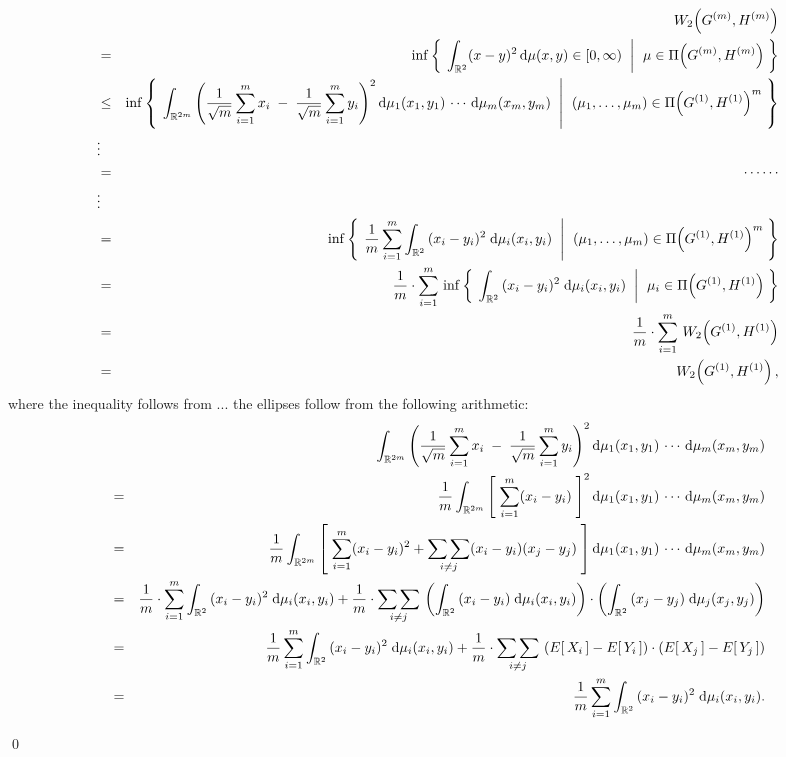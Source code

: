\proof
\begin{eqnarray*}
&&
	W_{2}\!\left(G^{(m)},H^{(m)}\right)
\\
& = &
	\inf\left\{\; \left. \int_{\mathbb{R}^{2}}(x - y)^{2}\,\textnormal{d}\mu(x,y) \in [0,\infty) \;\;\right\vert\;\, \mu \in \Pi\!\left(G^{(m)},H^{(m)}\right) \;\right\}
\\
&\leq&
	\inf\left\{\; \left.
	\int_{\mathbb{R}^{2m}}\left(\dfrac{1}{\sqrt{m}}\sum_{i=1}^{m}x_{i} \;-\; \dfrac{1}{\sqrt{m}}\sum_{i=1}^{m}y_{i}\right)^{2}
	\textnormal{d}\mu_{1}(x_{1},y_{1})\,\cdots\,\textnormal{d}\mu_{m}(x_{m},y_{m})
	\;\;\right\vert\;\,
	(\mu_{1},\ldots,\mu_{m}) \in \Pi\!\left(G^{(1)},H^{(1)}\right)^{m}
	\;\right\}
\\
&\vdots&
\\
&=& \cdots\cdots
\\
&\vdots&
\\
&=&
	\inf\left\{\; \left.
	\dfrac{1}{m}\sum_{i=1}^{m}\int_{\mathbb{R}^{2}}\,(x_{i}-y_{i})^{2}\;\textnormal{d}\mu_{i}(x_{i},y_{i})	
	\;\;\right\vert\;\,
	(\mu_{1},\ldots,\mu_{m}) \in \Pi\!\left(G^{(1)},H^{(1)}\right)^{m}
	\;\right\}
\\
&=&
	\dfrac{1}{m}\cdot\sum_{i=1}^{m}\,
	\inf\left\{\; \left.
	\int_{\mathbb{R}^{2}}\,(x_{i}-y_{i})^{2}\;\textnormal{d}\mu_{i}(x_{i},y_{i})	
	\;\;\right\vert\;\,
	\mu_{i} \in \Pi\!\left(G^{(1)},H^{(1)}\right)
	\;\right\}
\\
&=&
	\dfrac{1}{m}\cdot\sum_{i=1}^{m} \, W_{2}\!\left(G^{(1)},H^{(1)}\right)
\\
&=&
	W_{2}\!\left(G^{(1)},H^{(1)}\right),
\end{eqnarray*}
where the inequality follows from ...
the ellipses follow from the following arithmetic:
\begin{eqnarray*}
&&
	\int_{\mathbb{R}^{2m}}\left(\dfrac{1}{\sqrt{m}}\sum_{i=1}^{m}x_{i} \;-\; \dfrac{1}{\sqrt{m}}\sum_{i=1}^{m}y_{i}\right)^{2}
	\textnormal{d}\mu_{1}(x_{1},y_{1})\,\cdots\,\textnormal{d}\mu_{m}(x_{m},y_{m})
\\
&=&
	\dfrac{1}{m}\int_{\mathbb{R}^{2m}}\left[\;\sum_{i=1}^{m}(x_{i}-y_{i})\;\right]^{2}
	\textnormal{d}\mu_{1}(x_{1},y_{1})\,\cdots\,\textnormal{d}\mu_{m}(x_{m},y_{m})
\\
&=&
	\dfrac{1}{m}\int_{\mathbb{R}^{2m}}\left[\;\sum_{i=1}^{m}(x_{i}-y_{i})^{2} + \underset{i \neq j}{\sum\sum}(x_{i}-y_{i})(x_{j}-y_{j})\;\right]
	\textnormal{d}\mu_{1}(x_{1},y_{1})\,\cdots\,\textnormal{d}\mu_{m}(x_{m},y_{m})
\\
&=&
	\dfrac{1}{m}\cdot\sum_{i=1}^{m}\int_{\mathbb{R}^{2}}\,(x_{i}-y_{i})^{2}\;\textnormal{d}\mu_{i}(x_{i},y_{i})
	+
	\dfrac{1}{m}\cdot\underset{i \neq j}{\sum\sum}\,
	\left( \int_{\mathbb{R}^{2}}\,(x_{i}-y_{i})\;\textnormal{d}\mu_{i}(x_{i},y_{i}) \right)\cdot
	\left( \int_{\mathbb{R}^{2}}\,(x_{j}-y_{j})\;\textnormal{d}\mu_{j}(x_{j},y_{j}) \right)
\\
&=&
	\dfrac{1}{m}\sum_{i=1}^{m}\int_{\mathbb{R}^{2}}\,(x_{i}-y_{i})^{2}\;\textnormal{d}\mu_{i}(x_{i},y_{i})
	+
	\dfrac{1}{m}\cdot\underset{i \neq j}{\sum\sum}\,
	\left( E\!\left[\,X_{i}\,\right] - E\!\left[\,Y_{i}\,\right] \right)\cdot
	\left( E\!\left[\,X_{j}\,\right] - E\!\left[\,Y_{j}\,\right]  \right)
\\
&=&
	\dfrac{1}{m}\sum_{i=1}^{m}\int_{\mathbb{R}^{2}}\,(x_{i}-y_{i})^{2}\;\textnormal{d}\mu_{i}(x_{i},y_{i}).
\end{eqnarray*}

\qed

